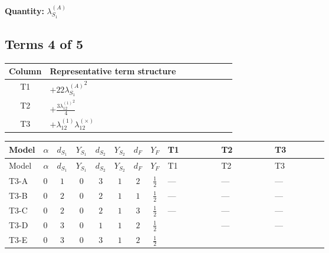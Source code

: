 \documentclass[8pt]{article}
\begin{document}
\begin{landscape}
\begin{longtable}{@{}llcccccc >{\raggedright\arraybackslash}p{0.21\linewidth} >{\raggedright\arraybackslash}p{0.21\linewidth} >{\raggedright\arraybackslash}p{0.21\linewidth}@{}}
\midrule
\bottomrule
\end{longtable}
\clearpage
\noindent\textbf{Quantity: }$\lambda_{S_1}^{(A)}$\par\smallskip
\subsection*{Terms 4 of 5}
\begin{center}
\begin{tabular}{@{}c >{\raggedright\arraybackslash}p{0.82\linewidth}@{}}
\toprule
Column & Representative term structure \\
\midrule
T1 & \(\displaystyle +22 {\lambda_{S_1}^{(A)}}^2\) \\
\midrule
T2 & \(\displaystyle +\frac{3 {\lambda_{12}^{(1)}}^2}{4}\) \\
\midrule
T3 & \(\displaystyle +{\lambda_{12}^{(1)}} {\lambda_{12}^{(\times)}}\) \\
\midrule
\bottomrule
\end{tabular}
\end{center}
\smallskip
\tiny
\begin{longtable}{@{}llcccccc >{\raggedright\arraybackslash}p{0.21\linewidth} >{\raggedright\arraybackslash}p{0.21\linewidth} >{\raggedright\arraybackslash}p{0.21\linewidth}@{}}
\toprule
Model & $\alpha$ & $d_{S_1}$ & $Y_{S_1}$ & $d_{S_2}$ & $Y_{S_2}$ & $d_F$ & $Y_F$ & T1 & T2 & T3 \\
\midrule
\endfirsthead
\toprule
Model & $\alpha$ & $d_{S_1}$ & $Y_{S_1}$ & $d_{S_2}$ & $Y_{S_2}$ & $d_F$ & $Y_F$ & T1 & T2 & T3 \\
\midrule
\endhead
T3-A & $0$ & $1$ & $0$ & $3$ & $1$ & $2$ & $\frac{1}{2}$ & --- & --- & --- \\
\midrule
T3-B & $0$ & $2$ & $0$ & $2$ & $1$ & $1$ & $\frac{1}{2}$ & --- & --- & --- \\
\midrule
T3-C & $0$ & $2$ & $0$ & $2$ & $1$ & $3$ & $\frac{1}{2}$ & --- & --- & --- \\
\midrule
T3-D & $0$ & $3$ & $0$ & $1$ & $1$ & $2$ & $\frac{1}{2}$ & \scriptsize\adjustbox{max width=\linewidth}{$\begin{gathered} +22 {\lambda_{S_1}^{(A)}}^2\end{gathered}$} & --- & --- \\
\midrule
T3-E & $0$ & $3$ & $0$ & $3$ & $1$ & $2$ & $\frac{1}{2}$ & \scriptsize\adjustbox{max width=\linewidth}{$\begin{gathered} +22 {\lambda_{S_1}^{(A)}}^2\end{gathered}$} & \scriptsize\adjustbox{max width=\linewidth}{$\begin{gathered} +\frac{3 {\lambda_{12}^{(1)}}^2}{4}\end{gathered}$} & \scriptsize\adjustbox{max width=\linewidth}{$\begin{gathered} +{\lambda_{12}^{(1)}} {\lambda_{12}^{(\times)}}\end{gathered}$} \\

\end{longtable}
\end{landscape}
\end{document}

